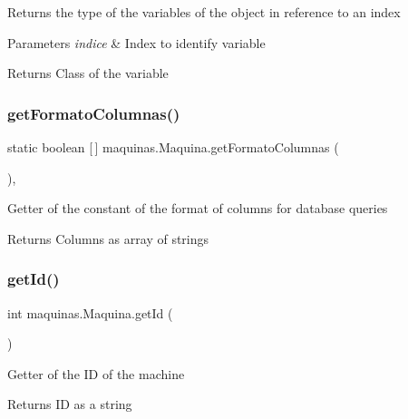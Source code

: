 Returns the type of the variables of the object in reference to an index


\begin{DoxyParams}{Parameters}
{\em indice} & Index to identify variable \\
\hline
\end{DoxyParams}
\begin{DoxyReturn}{Returns}
Class of the variable 
\end{DoxyReturn}
\mbox{\label{classmaquinas_1_1_maquina_a8bb7dae09526ff44e0e905be4305382c}} 
\subsubsection{\texorpdfstring{get\+Formato\+Columnas()}{getFormatoColumnas()}}
{\footnotesize\ttfamily static boolean \mbox{[}$\,$\mbox{]} maquinas.\+Maquina.\+get\+Formato\+Columnas (\begin{DoxyParamCaption}{ }\end{DoxyParamCaption})\hspace{0.3cm}{\ttfamily [inline]}, {\ttfamily [static]}}

Getter of the constant of the format of columns for database queries

\begin{DoxyReturn}{Returns}
Columns as array of strings 
\end{DoxyReturn}
\mbox{\label{classmaquinas_1_1_maquina_abaf73d4cd4f7608d86d303ff20046019}} 
\subsubsection{\texorpdfstring{get\+Id()}{getId()}}
{\footnotesize\ttfamily int maquinas.\+Maquina.\+get\+Id (\begin{DoxyParamCaption}{ }\end{DoxyParamCaption})\hspace{0.3cm}{\ttfamily [inline]}}

Getter of the ID of the machine

\begin{DoxyReturn}{Returns}
ID as a string 
\end{DoxyReturn}
\mbox{\label{classmaquinas_1_1_maquina_a47e430c44c10450125499adaeb26531c}} 
